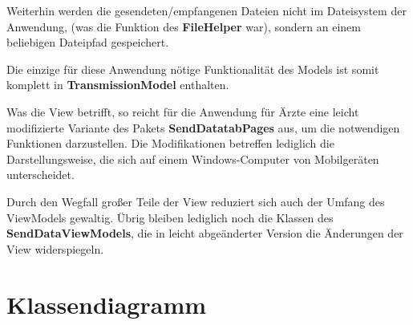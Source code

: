 \documentclass[a4paper]{scrreprt}
\begin{document}
Weiterhin werden die gesendeten/empfangenen Dateien nicht im Dateisystem der Anwendung, (was die Funktion des \textbf{FileHelper} war), sondern an einem beliebigen Dateipfad gespeichert.

Die einzige für diese Anwendung nötige Funktionalität des Models ist somit komplett in \textbf{TransmissionModel} enthalten.

Was die View betrifft, so reicht für die Anwendung für Ärzte eine leicht modifizierte Variante des Pakets \textbf{SendDatatabPages} aus, um die notwendigen Funktionen darzustellen. Die Modifikationen betreffen lediglich die Darstellungsweise, die sich auf einem Windows-Computer von Mobilgeräten unterscheidet.

Durch den Wegfall großer Teile der View reduziert sich auch der Umfang des ViewModels gewaltig. Übrig bleiben lediglich noch die Klassen des \textbf{SendDataViewModels}, die in leicht abgeänderter Version die Änderungen der View widerspiegeln.


\chapter{Klassendiagramm}


\printnoidxglossaries

\listoffigures
 
\end{document}
